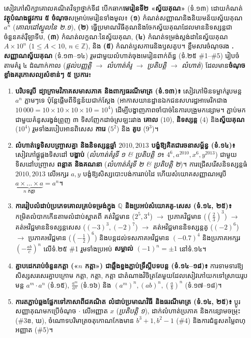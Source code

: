 \documentclass[a4paper,12pt]{article}
\newcommand{\en}[1]{{\TimesEn #1}}
\begin{document}
សៀវភៅសិក្សាគោលគណិតវិទ្យាថ្នាក់ទី៨ បើកឆាក\textbf{មេរៀនទី២ «ស្វ័យគុណ»} (ទំ\en{.}១៣) ដោយកំណត់\textbf{វត្ថុបំណងផ្លូវការ ៥ ចំណុច}សម្រាប់មេរៀនទាំងមូល៖ \textbf{(១)} កំណត់សញ្ញាណនិងនិយមន័យស្វ័យគុណ $a^n$ (\textit{គោលដៅស្នូលនៃ ២\en{.}១}), \textbf{(២)} ធ្វើប្រមាណវិធីគុណនិងចែកស្វ័យគុណដែលមាននិទស្សន្តជាចំនួនគត់រ៉ឺឡាទីប, \textbf{(៣)} កំណត់លក្ខណៈនៃស្វ័យគុណ, \textbf{(៤)} កំណត់ទម្រង់ស្តង់ដានៃស្វ័យគុណ $A \times 10^n$ ($1 \le A < 10$, $n\in\mathbb{Z}$), និង \textbf{(៥)} កំណត់ឫសការេនិងឫសគូប។ ខ្លឹមសារចំណុចរង \textbf{\en{1.} សញ្ញាណស្វ័យគុណ} (ទំ\en{.}១៣\en{--}១៤) រួមជាមួយលំហាត់ចុងមេរៀនពាក់ព័ន្ធ (ទំ\en{.}២៥ \en{\#1--\allowbreak\#5}) រៀបចំតាមគំរូ ៤ ដំណាក់កាល (\textit{ផ្ដល់បញ្ញត្តិ $\to$ លំហាត់គំរូ $\to$ ប្រតិបត្តិ $\to$ លំហាត់}) ដែលមាន\textbf{ចំណុចខ្លាំងគរុកោសល្យសំខាន់ៗ ៥ ប្រការ}៖
\begin{enumerate}[leftmargin=0.65cm, itemsep=0.7pt]
  \item \textbf{បរិបទរូបី ដ្យាក្រាមវិភាគសមាសភាគ និងពាក្យធរណីមាត្រ (ទំ\en{.}១៣)៖} សៀវភៅមិនទម្លាក់រូបមន្ត $a^n$ ភ្លាមៗទេ ប៉ុន្តែផ្ដើមពីទិន្នន័យជាក់ស្ដែង (អាកាសយានដ្ឋានឯកជនសហរដ្ឋអាមេរិកជាង $10\,000 = 10\times 10\times 10\times 10 = 10^4$) ដើម្បីបង្ហាញភាពចាំបាច់នៃការបង្រួមកន្សោម។ ភ្ជាប់មកជាមួយគំនូសរង្វង់ព្រួញ ៣ ទិសញែកដាច់ស្រឡះរវាង \textbf{គោល} ($10$), \textbf{និទស្សន្ត} ($4$) និង\textbf{ស្វ័យគុណ} ($10^4$) រួមទាំងរបៀបអានពិសេស \textbf{ការេ} ($5^2$) និង \textbf{គូប} ($9^3$)។
  \item \textbf{លំហាត់ទ្វេទិសបញ្ច្រាសគ្នា និងនិទស្សន្តឆ្នាំ $2010, 2013$ បង្ខំឱ្យគិតជារចនាសម្ព័ន្ធ (ទំ\en{.}១៤)៖} សៀវភៅផ្គូផ្គងទិសដៅ \textbf{បង្ហាប់} (\textit{លំហាត់គំរូទី ១ \& ប្រតិបត្តិ ១}៖ $4^6, a^{2010}, x^6, y^{2013}$) ជាមួយទិសដៅបញ្ច្រាស \textbf{ពន្លាត និងគណនា} (\textit{លំហាត់គំរូទី ២ \& ប្រតិបត្តិ ២})។ ការជ្រើសរើសនិទស្សន្តធំ $2010, 2013$ លើអក្សរ $a, y$ បង្ខំឱ្យសិស្សបោះបង់ការរាប់ដៃ ហើយសំយោគសញ្ញាណអរូបី $\underbrace{a\times\dots\times a}_{n\text{ កត្តា}}=a^n$។
  \item \textbf{ការរៀបលំដាប់ប្រភេទគោលគ្រប់ទម្រង់ក្នុង $\mathbb{Q}$ និងប្រអប់សំយោគគូ\en{-}សេស (ទំ\en{.}១៤, ២៥)៖} កម្រិតលំបាកកើនតាមលំដាប់ស្អាតពី គត់វិជ្ជមាន ($2^5, 3^4$) $\to$ ប្រភាគវិជ្ជមាន ($(\frac{2}{3})^3$) $\to$ គត់អវិជ្ជមាននិទស្សន្តសេស ($(-3)^3, (-2)^7$) $\to$ គត់អវិជ្ជមាននិទស្សន្តគូ ($(-2)^6$) $\to$ ប្រភាគអវិជ្ជមាន ($(-\frac{1}{2})^6$) និងបន្តដល់ទសភាគអវិជ្ជមាន $(-0.7)^4$ និងប្រភាគអក្សរ $(-\frac{ab}{c})^n$ លើទំ\en{.}២៥ \en{\#1} រួមទាំងប្រអប់ \textbf{សម្គាល់ $(-1)^n = \pm 1$} នៅទំ\en{.}១៤។
  \item \textbf{គ្នាបដេករាប់ចំនួនកត្តា («$n$ កត្តា») ជាឆ្អឹងខ្នងភ្ជាប់ទ្រឹស្ដីបទបន្ត (ទំ\en{.}១៤\en{--}១៨)៖} ការទាមទារឱ្យសិស្សសរសេរគ្នាបក្រោម \en{5} កត្តា\en{,} \en{3} កត្តា\en{,} \en{6} កត្តា ជាតំណាងវិចិត្រតែមួយដែលសៀវភៅយកទៅស្រាយរូបមន្ត $a^m\cdot a^n$ (ទំ\en{.}១៥), $\frac{a^m}{a^n}$ (ទំ\en{.}១៦) និង $(a^m)^n, (ab)^n, (\frac{a}{b})^n$ (ទំ\en{.}១៧\en{--}១៨)។
  \item \textbf{ការតភ្ជាប់ឆ្លងផ្នែកទៅភាសាពីជគណិត លំដាប់ប្រមាណវិធី និងធរណីមាត្រ (ទំ\en{.}១៤, ២៥)៖} ប្ដូរសញ្ញាគុណមកប្រើចំណុច $\cdot$ លើអញ្ញាត $x$ (\textit{ប្រតិបត្តិ ១}), ដាក់លំហាត់ប្រភាគ និងកន្សោមចម្រុះ (\en{\#3}ខ\en{,} ឃ), ចំណោទបរិមាត្រចតុកោណកែងមាន $b^3+1, b^2-1$ (\en{\#4}) និងការជំនួសតម្លៃពហុអញ្ញាត (\en{\#5})។
\end{enumerate}
\end{document}
